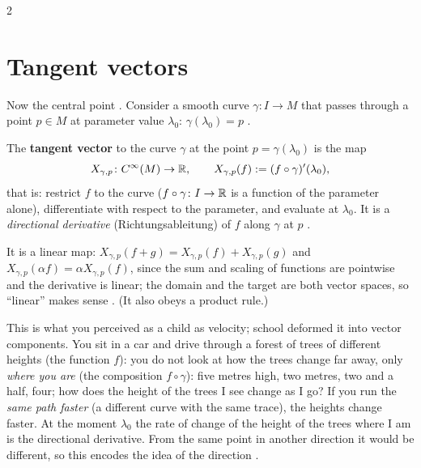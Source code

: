 \begin{paracol}{2}
\section{Tangent vectors}\label{sec:ts-tangent}

Now the central point . Consider a smooth curve $\gamma\colon I\to M$ that passes
through a point $p\in M$ at parameter value $\lambda_0$: $\gamma(\lambda_0)=p$ .

\begin{definition}\label{def:ts-tangent}
The \textbf{tangent vector} to the curve $\gamma$ at the point $p=\gamma(\lambda_0)$ is the map
\[
  X_{\gamma,p}\colon C^\infty(M)\to\mathbb{R},\qquad
  X_{\gamma,p}(f):=(f\circ\gamma)'(\lambda_0),
\]
that is: restrict $f$ to the curve ($f\circ\gamma\colon I\to\mathbb{R}$ is a function of the parameter alone), differentiate with
respect to the parameter, and evaluate at $\lambda_0$. It is a \emph{directional derivative}
(Richtungsableitung) of $f$ along $\gamma$ at $p$
.
\end{definition}
It is a linear map: $X_{\gamma,p}(f+g)=X_{\gamma,p}(f)+X_{\gamma,p}(g)$ and $X_{\gamma,p}(\alpha f)=\alpha X_{\gamma,p}(f)$, since
the sum and scaling of functions are pointwise and the derivative is linear; the domain and the target are both vector
spaces, so ``linear'' makes sense . (It also obeys a product rule.)

\begin{intuition}
This is what you perceived as a child as velocity; school deformed it into vector components. You sit in a car and drive
through a forest of trees of different heights (the function $f$): you do not look at how the trees change far away, only
\emph{where you are} (the composition $f\circ\gamma$): five metres high, two metres, two and a half, four; how does the
height of the trees I see change as I go? If you run the \emph{same path faster} (a different curve with the same trace),
the heights change faster. At the moment $\lambda_0$ the rate of change of the height of the trees where I am is the
directional derivative. From the same point in another direction it would be different, so this encodes the idea of the
direction .
\end{intuition}


\end{paracol}
